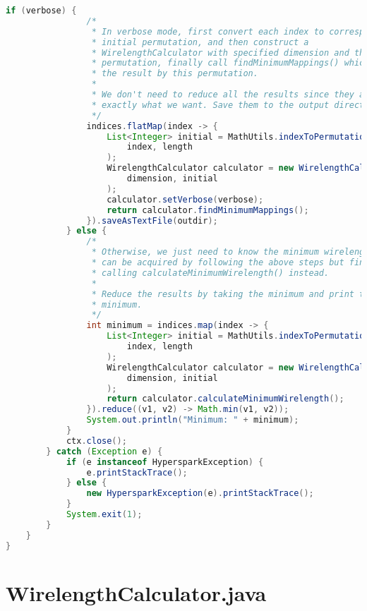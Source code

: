 \begin{lstlisting}[language = Java]
			if (verbose) {
				/*
				 * In verbose mode, first convert each index to corresponding
				 * initial permutation, and then construct a
				 * WirelengthCalculator with specified dimension and the initial
				 * permutation, finally call findMinimumMappings() which returns
				 * the result by this permutation.
				 *
				 * We don't need to reduce all the results since they are
				 * exactly what we want. Save them to the output directory.
				 */
				indices.flatMap(index -> {
					List<Integer> initial = MathUtils.indexToPermutation(
						index, length
					);
					WirelengthCalculator calculator = new WirelengthCalculator(
						dimension, initial
					);
					calculator.setVerbose(verbose);
					return calculator.findMinimumMappings();
				}).saveAsTextFile(outdir);
			} else {
				/*
				 * Otherwise, we just need to know the minimum wirelength, which
				 * can be acquired by following the above steps but finally
				 * calling calculateMinimumWirelength() instead.
				 *
				 * Reduce the results by taking the minimum and print the final
				 * minimum.
				 */
				int minimum = indices.map(index -> {
					List<Integer> initial = MathUtils.indexToPermutation(
						index, length
					);
					WirelengthCalculator calculator = new WirelengthCalculator(
						dimension, initial
					);
					return calculator.calculateMinimumWirelength();
				}).reduce((v1, v2) -> Math.min(v1, v2));
				System.out.println("Minimum: " + minimum);
			}
			ctx.close();
		} catch (Exception e) {
			if (e instanceof HypersparkException) {
				e.printStackTrace();
			} else {
				new HypersparkException(e).printStackTrace();
			}
			System.exit(1);
		}
	}
}
\end{lstlisting}

\clearpage
\section{WirelengthCalculator.java}
\label{Section A.2}

